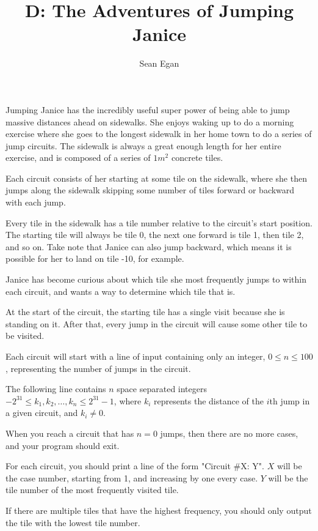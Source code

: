 \documentclass{article}
\title{D: The Adventures of Jumping Janice}
\author{Sean Egan}
\begin{document}
\begin{problemDescription}
Jumping Janice has the incredibly useful super power of being able to jump massive distances ahead on sidewalks. She enjoys waking up to do a morning exercise where she goes to the longest sidewalk in her home town to do a series of jump circuits. The sidewalk is always a great enough length for her entire exercise, and is composed of a series of $1m^2$ concrete tiles.

Each circuit consists of her starting at some tile on the sidewalk, where she then jumps along the sidewalk skipping some number of tiles forward or backward with each jump.

Every tile in the sidewalk has a tile number relative to the circuit's start position. The starting tile will always be tile 0, the next one forward is tile 1, then tile 2, and so on. Take note that Janice can also jump backward, which means it is possible for her to land on tile -10, for example.

Janice has become curious about which tile she most frequently jumps to within each circuit, and wants a way to determine which tile that is.

At the start of the circuit, the starting tile has a single visit because she is standing on it. After that, every jump in the circuit will cause some other tile to be visited.

\end{problemDescription}

\begin{inputDescription}
Each circuit will start with a line of input containing only an integer, $0 \leq n \leq 100$, representing the number of jumps in the circuit. 

The following line contains $n$ space separated integers $ -2^{31} \leq k_1, k_2, \dots, k_n \leq 2^{31} - 1 $, where $k_i$ represents the distance of the $i$th jump in a given circuit, and $k_i \neq 0$.

When you reach a circuit that has $ n = 0 $ jumps, then there are no more cases, and your program should exit.

\end{inputDescription}

\begin{outputDescription}
For each circuit, you should print a line of the form "Circuit \#X: Y". $X$ will be the case number, starting from 1, and increasing by one every case. $Y$ will be the tile number of the most frequently visited tile.

If there are multiple tiles that have the highest frequency, you should only output the tile with the lowest tile number.

\end{outputDescription}
\end{document}
